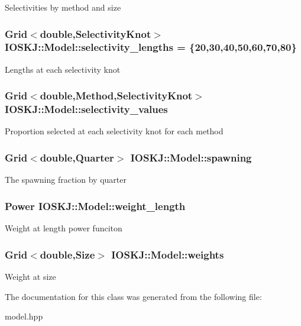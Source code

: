 Selectivities by method and size \hypertarget{classIOSKJ_1_1Model_a16348f2bb00494e5525d9eeef50e6fbe}{
\subsubsection[{selectivity\-\_\-lengths}]{\setlength{\rightskip}{0pt plus 5cm}Grid$<$double,Selectivity\-Knot$>$ I\-O\-S\-K\-J\-::\-Model\-::selectivity\-\_\-lengths = \{20,30,40,50,60,70,80\}}}\label{classIOSKJ_1_1Model_a16348f2bb00494e5525d9eeef50e6fbe}
Lengths at each selectivity knot \hypertarget{classIOSKJ_1_1Model_a325ae5d4dfdf49ec5eb21dd01f703c7c}{
\subsubsection[{selectivity\-\_\-values}]{\setlength{\rightskip}{0pt plus 5cm}Grid$<$double,Method,Selectivity\-Knot$>$ I\-O\-S\-K\-J\-::\-Model\-::selectivity\-\_\-values}}\label{classIOSKJ_1_1Model_a325ae5d4dfdf49ec5eb21dd01f703c7c}
Proportion selected at each selectivity knot for each method \hypertarget{classIOSKJ_1_1Model_a2d388216b15e6f23df852c16c82b9fe1}{
\subsubsection[{spawning}]{\setlength{\rightskip}{0pt plus 5cm}Grid$<$double,Quarter$>$ I\-O\-S\-K\-J\-::\-Model\-::spawning}}\label{classIOSKJ_1_1Model_a2d388216b15e6f23df852c16c82b9fe1}
The spawning fraction by quarter \hypertarget{classIOSKJ_1_1Model_af6fe777cc3d2e8650b19d93aaea85b04}{
\subsubsection[{weight\-\_\-length}]{\setlength{\rightskip}{0pt plus 5cm}Power I\-O\-S\-K\-J\-::\-Model\-::weight\-\_\-length}}\label{classIOSKJ_1_1Model_af6fe777cc3d2e8650b19d93aaea85b04}
Weight at length power funciton \hypertarget{classIOSKJ_1_1Model_adf493cf27e4295cc9cb3dcef50390c06}{
\subsubsection[{weights}]{\setlength{\rightskip}{0pt plus 5cm}Grid$<$double,Size$>$ I\-O\-S\-K\-J\-::\-Model\-::weights}}\label{classIOSKJ_1_1Model_adf493cf27e4295cc9cb3dcef50390c06}
Weight at size 

The documentation for this class was generated from the following file\-:\begin{DoxyCompactItemize}
\item 
model.\-hpp\end{DoxyCompactItemize}

